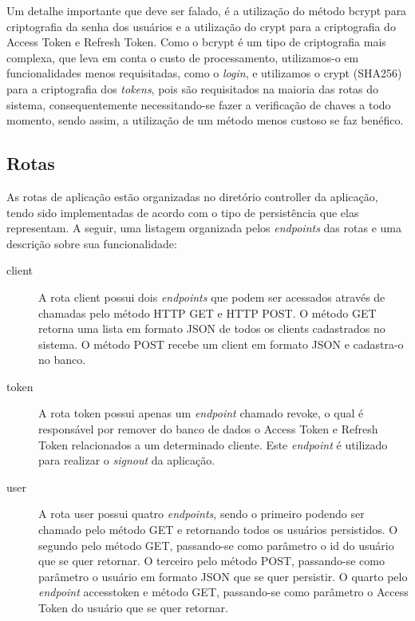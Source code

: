 Um detalhe importante que deve ser falado, é a utilização do método bcrypt \cite{bcrypt} para criptografia da senha dos usuários e a utilização do crypt \cite{crypt} para a criptografia do Access Token e Refresh Token. Como o bcrypt é um tipo de criptografia mais complexa, que leva em conta o custo de processamento, utilizamos-o em funcionalidades menos requisitadas, como o \textit{login}, e utilizamos o crypt (SHA256) para a criptografia dos \textit{tokens}, pois são requisitados na maioria das rotas do sistema, consequentemente necessitando-se fazer a verificação de chaves a todo momento, sendo assim, a utilização de um método menos custoso se faz benéfico.

\subsection{Rotas}
As rotas de aplicação estão organizadas no diretório controller da aplicação, tendo sido implementadas de acordo com o tipo de persistência que elas representam. A seguir, uma listagem organizada pelos \textit{endpoints} das rotas e uma descrição sobre sua funcionalidade:

\begin{description}
	\item[client] A rota client possui dois \textit{endpoints} que podem ser acessados através de chamadas pelo método HTTP GET e HTTP POST. O método GET retorna uma lista em formato JSON de todos os clients cadastrados no sistema. O método POST recebe um client em formato JSON e cadastra-o no banco.
	
	\item[token] A rota token possui apenas um \textit{endpoint} chamado revoke, o qual é responsável por remover do banco de dados o Access Token e Refresh Token relacionados a um determinado cliente. Este \textit{endpoint} é utilizado para realizar o \textit{signout} da aplicação.
	
	\item[user] A rota user possui quatro \textit{endpoints}, sendo o primeiro podendo ser chamado pelo método GET e retornando todos os usuários persistidos. O segundo pelo método GET, passando-se como parâmetro o id do usuário que se quer retornar. O terceiro pelo método POST, passando-se como parâmetro o usuário em formato JSON que se quer persistir. O quarto pelo \textit{endpoint} accesstoken e método GET, passando-se como parâmetro o Access Token do usuário que se quer retornar.
\end{description}

